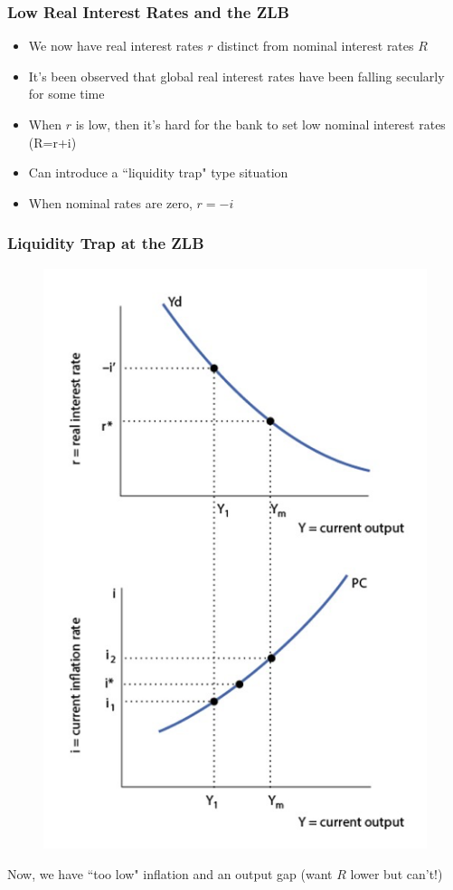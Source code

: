 \documentclass{beamer}
\begin{document}
\begin{frame}
\frametitle[alignment=center]{Low Real Interest Rates and the ZLB}
\begin{itemize}
\item We now have real interest rates $r$ distinct from nominal interest rates $R$
\bigskip
\item It's been observed that global real interest rates have been falling secularly for some time
\bigskip
\item When $r$ is low, then it's hard for the bank to set low nominal interest rates (R=r+i)
\bigskip
\item Can introduce a ``liquidity trap" type situation
\bigskip
\item When nominal rates are zero, $r=-i$
\end{itemize}
\end{frame}


\begin{frame}
\frametitle[alignment=center]{Liquidity Trap at the ZLB}
\begin{figure}
\centering
\includegraphics[scale=0.5]{Figures/W_Fig_15pt6.png}
\end{figure}
Now, we have ``too low" inflation and an output gap (want $R$ lower but can't!)
\end{frame}
\end{document}
